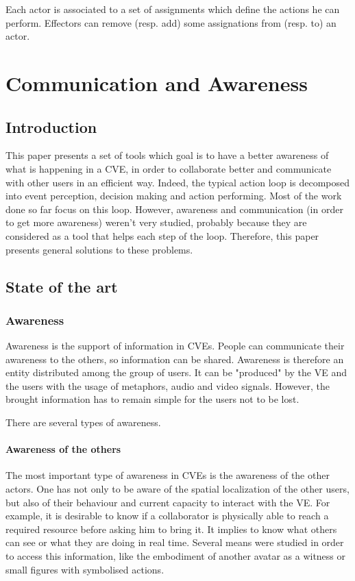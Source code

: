 \documentclass[a4paper]{article}
\begin{document}
Each actor is associated to a set of assignments which define the actions he can perform. Effectors can remove (resp. add) some assignations from (resp. to) an actor. 

\section{Communication and Awareness}

\subsection{Introduction}
This paper presents a set of tools which goal is to have a better awareness of what is happening in a CVE, in order to collaborate better and communicate with other users in an efficient way. Indeed, the typical action loop is decomposed into event perception, decision making and action performing. Most of the work done so far focus on this loop. However, awareness and communication (in order to get more awareness) weren't very studied, probably because they are considered as a tool that helps each step of the loop. Therefore, this paper presents general solutions to these problems.

\subsection{State of the art}

\subsubsection{Awareness}
Awareness is the support of information in CVEs. People can communicate their awareness to the others, so information can be shared. Awareness is therefore an entity distributed among the group of users. It can be "produced" by the VE and the users with the usage of metaphors, audio and video signals. However, the brought information has to remain simple for the users not to be lost.

There are several types of awareness.

\paragraph{Awareness of the others}
The most important type of awareness in CVEs is the awareness of the other actors. One has not only to be aware of the spatial localization of the other users, but also of their behaviour and current capacity to interact with the VE. For example, it is desirable to know if a collaborator is physically able to reach a required resource before asking him to bring it. It implies to know what others can see or what they are doing in real time. Several means were studied in order to access this information, like the embodiment of another avatar as a witness or small figures with symbolised actions.
\end{document}
